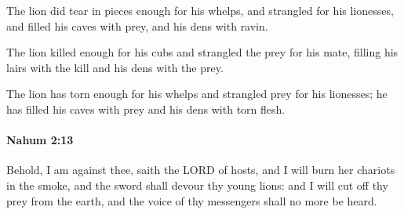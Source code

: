 			\begin{versebox}
					\item[BHS] 
					\item[LXX] 
					\item[ASV] The lion did tear in pieces enough for his whelps, and strangled for his lionesses, and filled his caves with prey, and his dens with ravin.
					\item[NIV] The lion killed enough for his cubs and strangled the prey for his mate, filling his lairs with the kill and his dens with the prey.
					\item[NRSV] The lion has torn enough for his whelps and strangled prey for his lionesses; he has filled his caves with prey and his dens with torn flesh.
			\end{versebox}

		\paragraph{Nahum 2:13} %
			\label{NAHUM-2-13}

			Behold, I am against thee, saith the LORD of hosts, and I will burn her chariots in the smoke, and the sword shall devour thy young lions: and I will cut off thy prey from the earth, and the voice of thy messengers shall no more be heard.

